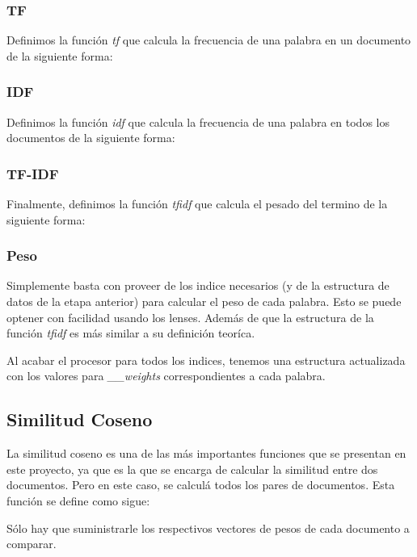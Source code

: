 \documentclass{nrfh-ish}
\begin{document}
\subsubsection{TF}
Definimos la función \textit{tf} que calcula la frecuencia de una
palabra en un documento de la siguiente forma:



\subsubsection{IDF}
Definimos la función \textit{idf} que calcula la frecuencia de una
palabra en todos los documentos de la siguiente forma:




\subsubsection{TF-IDF}
Finalmente, definimos la función \textit{tfidf} que calcula el
pesado del termino de la siguiente forma:



\subsubsection{Peso}
Simplemente basta con proveer de los indice necesarios (y de la
estructura de datos de la etapa anterior) para calcular el peso
de cada palabra. Esto se puede optener con facilidad usando los
lenses. Además de que la estructura de la función \textit{tfidf}
es más similar a su definición teoríca.

Al acabar el procesor para todos los indices, tenemos una estructura
actualizada con los valores para \textit{\_\_weights}
correspondientes a cada palabra.

\subsection{Similitud Coseno}
La similitud coseno es una de las más importantes funciones que
se presentan en este proyecto, ya que es la que se encarga de
calcular la similitud entre dos documentos. Pero en este caso,
se calculá todos los pares de documentos. Esta función se define
como sigue:


Sólo hay que suministrarle los respectivos vectores de pesos
de cada documento a comparar.
\end{document}
